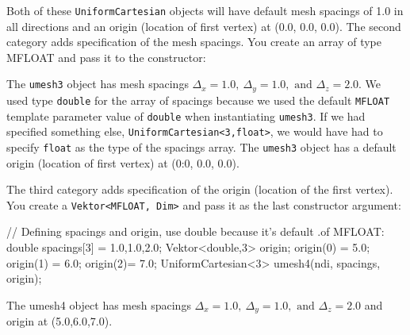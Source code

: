 Both of these \texttt{UniformCartesian} objects will have default mesh spacings of 1.0 in all directions and an origin (location of first vertex) at (0.0, 0.0, 0.0). 
The second category adds specification of the mesh spacings. You create an array of type MFLOAT and pass it to the constructor:
 
\begin{smallcode}
double spacings[3] = {1. 0, 1,.0, 2.0}; //double because default of MFLOAT 
UniformCartesian<3> umesh3{ndi, spacings);
\end{smallcode} 

The \texttt{umesh3} object has mesh spacings $\Delta_x= 1.0,~\Delta_y=1.0, \text{ and }\Delta_z = 2.0$. We used type \texttt{double} for the array of spacings because we used the 
default \texttt{MFLOAT} template parameter value of \texttt{double} when instantiating \texttt{umesh3}. If we had specified something else, \texttt{UniformCartesian<3,float>}, we 
would have had to specify \texttt{float} as the type of the spacings array. The \texttt{umesh3} object has a default origin (location of first vertex) at (0:0, 0.0, 0.0). 

The third category adds specification of the origin (location of the first vertex). You create a \texttt{Vektor<MFLOAT, Dim>} and pass it as the last constructor argument: 

\begin{smallcode}
// Defining spacings and origin, use double because it's default .of MFLOAT: 
double spacings[3] = {1.0,1.0,2.0}; 
Vektor<double,3> origin; 
origin(0) = 5.0; origin(1) = 6.0; origin(2)= 7.0; 
UniformCartesian<3> umesh4(ndi, spacings, origin); 
\end{smallcode}
The umesh4 object has mesh spacings $\Delta_x= 1.0,~\Delta_y=1.0, \text{ and }\Delta_z = 2.0$ and origin at (5.0,6.0,7.0).



